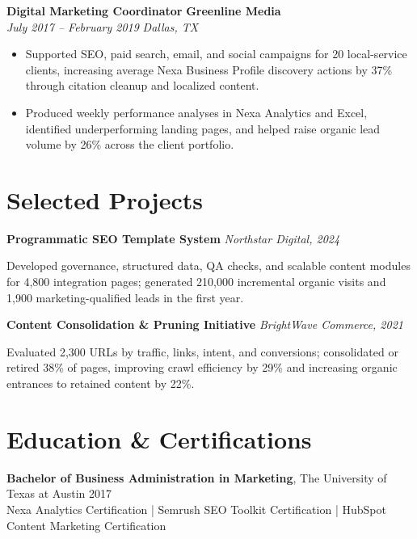 \documentclass[10pt,a4paper]{article}
\newcommand{\role}[4]{%
  \textbf{#1} \hfill \textbf{#2}\\[-0.08em]
  \textit{#3} \hfill \textit{#4}\par
}
\newcommand{\project}[2]{%
  \textbf{#1} \hfill \textit{#2}\par
}
\begin{document}
\role{Digital Marketing Coordinator}{Greenline Media}{July 2017 -- February 2019}{Dallas, TX}
\begin{itemize}
  \item Supported SEO, paid search, email, and social campaigns for 20 local-service clients, increasing average Nexa Business Profile discovery actions by 37\% through citation cleanup and localized content.
  \item Produced weekly performance analyses in Nexa Analytics and Excel, identified underperforming landing pages, and helped raise organic lead volume by 26\% across the client portfolio.
\end{itemize}

\section*{Selected Projects}
\project{Programmatic SEO Template System}{Northstar Digital, 2024}
Developed governance, structured data, QA checks, and scalable content modules for 4,800 integration pages; generated 210,000 incremental organic visits and 1,900 marketing-qualified leads in the first year.

\project{Content Consolidation \& Pruning Initiative}{BrightWave Commerce, 2021}
Evaluated 2,300 URLs by traffic, links, intent, and conversions; consolidated or retired 38\% of pages, improving crawl efficiency by 29\% and increasing organic entrances to retained content by 22\%.

\section*{Education \& Certifications}
\textbf{Bachelor of Business Administration in Marketing}, The University of Texas at Austin \hfill 2017\\
Nexa Analytics Certification \textcolor{muted}{|} Semrush SEO Toolkit Certification \textcolor{muted}{|} HubSpot Content Marketing Certification
\end{document}

